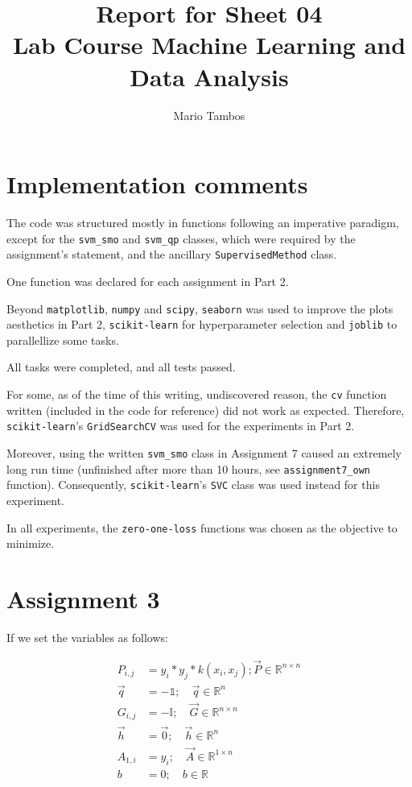 \documentclass[a4paper,11pt]{article}
\begin{document}
\author{Mario Tambos}
\title{\vspace{-2cm}Report for Sheet 04\\
\small{Lab Course Machine Learning and Data Analysis}}
\maketitle

\section*{Implementation comments}

The code was structured mostly in functions following an imperative paradigm, except for the \verb|svm_smo| and \verb|svm_qp| classes, which were required by the assignment's statement, and the ancillary \verb|SupervisedMethod| class.

One function was declared for each assignment in Part 2.

Beyond \verb|matplotlib|, \verb|numpy| and \verb|scipy|, \verb|seaborn| was used to improve the plots aesthetics in Part 2, \verb|scikit-learn| for hyperparameter selection and \verb|joblib| to parallellize some tasks.


All tasks were completed, and all tests passed.

For some, as of the time of this writing, undiscovered reason, the \verb|cv| function written (included in the code for reference) did not work as expected.
Therefore, \verb|scikit-learn|'s \verb|GridSearchCV| was used for the experiments in Part 2.

Moreover, using the written \verb|svm_smo| class in Assignment 7 caused an extremely long run time (unfinished after more than 10 hours, see \verb|assignment7_own| function).
Consequently, \verb|scikit-learn|'s \verb|SVC| class was used instead for this experiment.
 
In all experiments, the \verb|zero-one-loss| functions was chosen as the objective to minimize.

\section*{Assignment 3}

If we set the variables as follows:

\begin{align*}
    P_{i,j} &= y_i * y_j * k(x_i, x_j); \vec{P}\in \mathbb{R}^{n\times n} \\
    \vec{q} &= -\mathds{1};\quad \vec{q} \in \mathbb{R}^n \\
    G_{i,j} &= -\mathbb{I}; \quad \vec{G}\in\mathbb{R}^{n\times n}\\
    \vec{h} &= \vec{0};\quad \vec{h} \in \mathbb{R}^{n} \\
    A_{1,i} &= y_i; \quad \vec{A} \in \mathbb{R}^{1\times n}\\
    b &= 0;\quad b \in \mathbb{R}
\end{align*}
\end{document}
